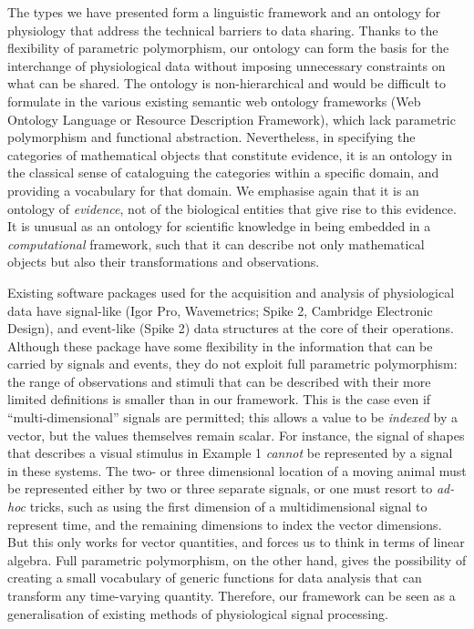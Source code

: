 The types we have presented form a linguistic framework and an
ontology for physiology that address the technical barriers to data
sharing. Thanks to the flexibility of parametric polymorphism, our
ontology can form the basis for the interchange of physiological data
without imposing unnecessary constraints on what can be shared. The
ontology is non-hierarchical and would be difficult to formulate in the
various existing semantic web ontology frameworks (Web Ontology
Language or Resource Description Framework), which lack parametric
polymorphism and functional abstraction. Nevertheless, in specifying
the categories of mathematical objects that constitute evidence, it is
an ontology in the classical sense of cataloguing the categories within
a specific domain, and providing a vocabulary for that domain. We
emphasise again that it is an ontology of \emph{evidence}, not of the
biological entities that give rise to this evidence. It is unusual as
an ontology for scientific knowledge in being embedded in a
\emph{computational} framework, such that it can describe not only
mathematical objects but also their transformations and observations.

Existing software packages used for the acquisition and analysis of
physiological data have signal-like (Igor Pro, Wavemetrics; Spike 2,
Cambridge Electronic Design), and event-like (Spike 2) data structures
at the core of their operations. Although these package have some
flexibility in the information that can be carried by signals and
events, they do not exploit full parametric polymorphism: the range of
observations and stimuli that can be described with their more limited
definitions is smaller than in our framework. This is the case even if
``multi-dimensional'' signals are permitted; this allows a value to
be \emph{indexed} by a vector, but the values themselves remain
scalar. For instance, the signal of shapes that describes a visual
stimulus in Example 1 \emph{cannot} be represented by a signal in
these systems. The two- or three dimensional location of a moving
animal must be represented either by two or three separate signals, or
one must resort to \emph{ad-hoc} tricks, such as using the first
dimension of a multidimensional signal to represent time, and the
remaining dimensions to index the vector dimensions. But this only
works for vector quantities, and forces us to think in terms of linear
algebra. Full parametric polymorphism, on the other hand, gives the
possibility of creating a small vocabulary of generic functions for
data analysis that can transform any time-varying quantity. Therefore,
our framework can be seen as a generalisation of existing methods of
physiological signal processing.

